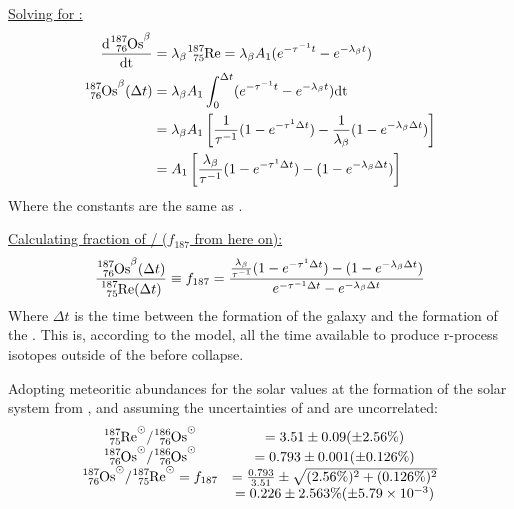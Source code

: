 \underline{Solving for :}
\begin{align*}
  \d{\os{187}^\beta} &= \lambda_\beta \re{187} = \lambda_\beta A_1 (e^{-\tau^{-1}t} - e^{-\lambda_\beta t}) \\
  \os{187}^\beta(\Delta t) &= \lambda_\beta A_1 \int_0^{\Delta t} (e^{-\tau^{-1}t} - e^{-\lambda_\beta t}) \textrm{dt} \\
  &= \lambda_\beta A_1 \left[ \frac{1}{\tau^{-1}} (1-e^{-\tau^{1}\Delta t}) - \frac{1}{\lambda_\beta} (1-e^{-\lambda_\beta \Delta t}) \right] \\
  &= A_1 \left[ \frac{\lambda_\beta}{\tau^{-1}} (1-e^{-\tau^{1}\Delta t}) - (1-e^{-\lambda_\beta \Delta t}) \right] \\
\end{align*}
Where the constants are the same as .

\newcommand\fraction{\frac{\os{187}}{\re{187}}}
\newcommand\fracfsos{f_{187}(t_{sos})}
\newcommand\fracnow{f_{187}(t_{now})}
\underline{Calculating fraction of / ($f_{187}$ from here on):}
\begin{equation}
  \label{eq:luck-fractio}
  \frac{\os{187}^\beta(\Delta t)}{\re{187}(\Delta t)} \equiv f_{187} = \frac{\frac{\lambda_\beta}{\tau^{-1}} (1-e^{-\tau^{1}\Delta t}) - (1-e^{-\lambda_\beta \Delta t})}{e^{-\tau^{-1} \Delta t} - e^{-\lambda_\beta \Delta t}}
\end{equation}
Where $\Delta t$ is the time between the formation of the galaxy and the formation of the \sos. This is, according to the model, all the time available to produce r-process isotopes outside of the \sos before collapse.

Adopting meteoritic abundances for the solar values at the formation of the solar system from , and assuming the uncertainties of  and  are uncorrelated:
\begin{equation}
  \label{eq:shizuma-frac}
  \begin{array}{cc}
    \re{187}^\odot/\os{186}^\odot &= 3.51 \pm 0.09 (\pm 2.56\%) \\
    \os{187}^\odot/\os{186}^\odot &= 0.793 \pm 0.001 (\pm 0.126\%) \\
    \os{187}^\odot/\re{187}^\odot = f_{187} &= \frac{0.793}{3.51} \pm \sqrt{(2.56\%)^2 + (0.126\%)^2} \\
    &= 0.226 \pm 2.563\% (\pm 5.79\times 10^{-3})
  \end{array}
\end{equation}

